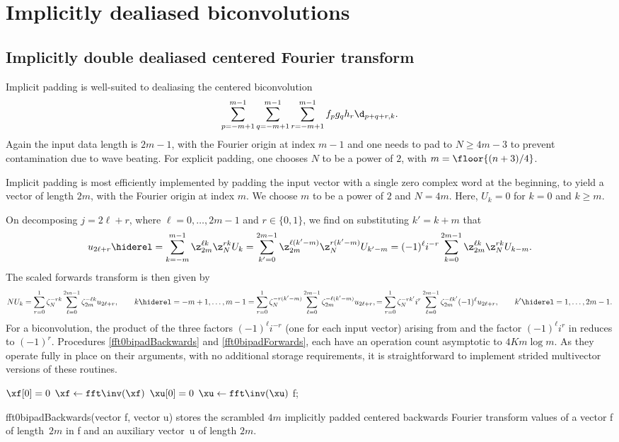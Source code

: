 \documentclass[final]{siamltex}
\def\bel{\begin{dmath}}
\def\eel{\end{dmath}}
\def\no{\hiderel}
\begin{document}
\section{Implicitly dealiased biconvolutions}\label{hyper}

\subsection{Implicitly double dealiased centered Fourier transform}
\label{fft0bi}
Implicit padding is well-suited to dealiasing the centered biconvolution 
$$
\sum_{p=-m+1}^{m-1}\sum_{q=-m+1}^{m-1}\sum_{r=-m+1}^{m-1} f_p g_q h_r\d_{p+q+r,k}.
$$
Again the input data length is $2m-1$, with the Fourier origin at index
$m-1$ and one needs to pad to $N\ge 4m-3$ to prevent contamination due to
wave beating.
For explicit padding, one chooses $N$ to be a power of $2$, with
$m=\floor{(n+3)/4}$.

Implicit padding is most efficiently implemented by padding the input
vector with a single zero complex word at the beginning, to yield a vector
of length $2m$, with the Fourier origin at index $m$. We choose $m$ to be
a power of $2$ and $N=4m$. Here, $U_k=0$ for $k=0$ and $k\ge m$. 

On decomposing $j=2\ell+r$, where $\ell=0,\ldots, 2m-1$ and $r\in\{0,1\}$,
we find on substituting $k'=k+m$ that
\bel
u_{2\ell +r}\no=\sum_{k=-m}^{m-1}\z_{2m}^{\ell k} \z_N^{rk} U_k
=\sum_{k'=0}^{2m-1}\z_{2m}^{\ell (k'-m)} \z_N^{r(k'-m)} U_{k'-m}
=(-1)^\ell i^{-r}\sum_{k=0}^{2m-1}\z_{2m}^{\ell k} \z_N^{rk} U_{k-m}.
\label{fft0bibackwards}
\eel
The scaled forwards transform is then given by
\bel
NU_k=\sum_{r=0}^{1}\zeta_N^{-rk}\sum_{\ell=0}^{2m-1}\zeta_{2m}^{-\ell k} u_{2\ell+r},
\qquad k\no =-m+1,\ldots,m-1
=\sum_{r=0}^{1}\zeta_N^{-r(k'-m)}\sum_{\ell=0}^{2m-1}\zeta_{2m}^{-\ell (k'-m)} u_{2\ell+r},
=\sum_{r=0}^{1}\zeta_N^{-rk'}i^r\sum_{\ell=0}^{2m-1}\zeta_{2m}^{-\ell k'}(-1)^\ell u_{2\ell+r},
\qquad k'\no =1,\ldots,2m-1.\label{fft0biforwards}
\eel
For a biconvolution, the product of the three factors $(-1)^\ell i^{-r}$
(one for each input vector) arising from 
and the factor $(-1)^\ell i^r$ in  reduces to $(-1)^r$.
Procedures \ref{fft0bipadBackwards} and \ref{fft0bipadForwards},
each have an operation count asymptotic to $4Km\log m$. As they
operate fully in place on their arguments, with no additional storage
requirements, it is straightforward to implement strided multivector
versions of these routines.

\begin{procedure}[htbp]
  $\xf[0]=0$\;
  $\xf \leftarrow \fft\inv(\xf)$\;
  $\xu[0]=0$\;
  $\xu \leftarrow \fft\inv(\xu)$\;
  \Return f;
  \caption{fft0bipadBackwards(vector {\sf f}, vector {\sf u}) stores the scrambled
$4m$ implicitly padded centered backwards Fourier transform values of a
vector {\sf f} of length~$2m$ in {\sf f} and an auxiliary vector~{\sf u} of
length $2m$.}\label{fft0bipadBackwards}
\end{procedure}
\end{document}
